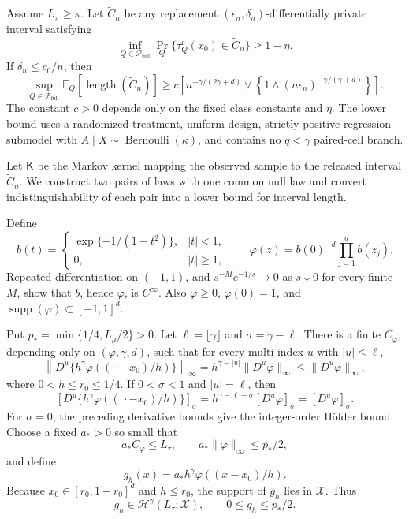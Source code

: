 Assume \(L_\pi\ge\kappa\).  Let \(\widetilde C_n\) be any replacement \((\epsilon_n,\delta_n)\)-differentially private interval satisfying
\[
 \inf_{Q\in\mathcal P_{\mathrm{full}}}
 \Pr_Q\{\tau_Q^{\mathrm c}(x_0)\in\widetilde C_n\}\ge1-\eta.
\]
If \(\delta_n\le c_0/n\), then
\[
 \sup_{Q\in\mathcal P_{\mathrm{full}}}
 \mathbb E_Q[\operatorname{length}(\widetilde C_n)]
 \ge c\left[n^{-\gamma/(2\gamma+d)}
 \vee\left\{1\wedge(n\epsilon_n)^{-\gamma/(\gamma+d)}\right\}\right].
\]
The constant \(c>0\) depends only on the fixed class constants and \(\eta\).  The lower bound uses a randomized-treatment, uniform-design, strictly positive regression submodel with \(A\mid X\sim\operatorname{Bernoulli}(\kappa)\), and contains no \(q<\gamma\) paired-cell branch.

Let \(\mathsf K\) be the Markov kernel mapping the observed sample to the released interval \(\widetilde C_n\).  We construct two pairs of laws with one common null law and convert indistinguishability of each pair into a lower bound for interval length.

Define
\[
 b(t)=
 \begin{cases}
  \exp\{-1/(1-t^2)\},& |t|<1,\\
  0,& |t|\ge1,
 \end{cases}
 \qquad
 \varphi(z)=b(0)^{-d}\prod_{j=1}^d b(z_j).
\]
Repeated differentiation on \((-1,1)\), and \(s^{-M}e^{-1/s}\to0\) as \(s\downarrow0\) for every finite \(M\), show that \(b\), hence \(\varphi\), is \(C^\infty\).  Also \(\varphi\ge0\), \(\varphi(0)=1\), and \(\operatorname{supp}(\varphi)\subset[-1,1]^d\).

Put \(p_* = \min\{1/4,L_\mu/2\}>0\).  Let \(\ell=\lfloor\gamma\rfloor\) and \(\sigma=\gamma-\ell\).  There is a finite \(C_\varphi\), depending only on \((\varphi,\gamma,d)\), such that for every multi-index \(u\) with \(|u|\le\ell\),
\[
 \left\|D^u\{h^\gamma\varphi((\,\cdot-x_0)/h)\}\right\|_\infty
 =h^{\gamma-|u|}\|D^u\varphi\|_\infty
 \le \|D^u\varphi\|_\infty,
\]
where \(0<h\le r_0\le1/4\).  If \(0<\sigma<1\) and \(|u|=\ell\), then
\[
 \left[D^u\{h^\gamma\varphi((\,\cdot-x_0)/h)\}\right]_{\sigma}
 =h^{\gamma-\ell-\sigma}[D^u\varphi]_{\sigma}
 =[D^u\varphi]_{\sigma}.
\]
For \(\sigma=0\), the preceding derivative bounds give the integer-order H\"older bound.  Choose a fixed \(a_*>0\) so small that
\[
 a_*C_\varphi\le L_\tau,
 \qquad a_*\|\varphi\|_\infty\le p_*/2,
\]
and define
\[
 g_h(x)=a_*h^\gamma\varphi((x-x_0)/h).
\]
Because \(x_0\in[r_0,1-r_0]^d\) and \(h\le r_0\), the support of \(g_h\) lies in \(\mathcal X\).  Thus
\[
 g_h\in\mathcal H^\gamma(L_\tau;\mathcal X),
 \qquad 0\le g_h\le p_*/2.
\tag{1}
\]

